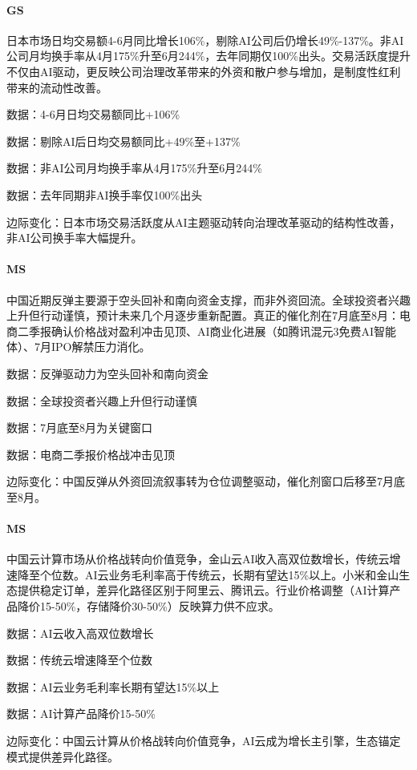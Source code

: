 \documentclass[11pt]{ctexart}
\begin{document}
\paragraph{GS} 日本市场日均交易额4-6月同比增长106\%，剔除AI公司后仍增长49\%-137\%。非AI公司月均换手率从4月175\%升至6月244\%，去年同期仅100\%出头。交易活跃度提升不仅由AI驱动，更反映公司治理改革带来的外资和散户参与增加，是制度性红利带来的流动性改善。
{\small\color{refgray}数据：4-6月日均交易额同比+106\%\par}
{\small\color{refgray}数据：剔除AI后日均交易额同比+49\%至+137\%\par}
{\small\color{refgray}数据：非AI公司月均换手率从4月175\%升至6月244\%\par}
{\small\color{refgray}数据：去年同期非AI换手率仅100\%出头\par}
{\small\color{refgray}边际变化：日本市场交易活跃度从AI主题驱动转向治理改革驱动的结构性改善，非AI公司换手率大幅提升。\par}
\paragraph{MS} 中国近期反弹主要源于空头回补和南向资金支撑，而非外资回流。全球投资者兴趣上升但行动谨慎，预计未来几个月逐步重新配置。真正的催化剂在7月底至8月：电商二季报确认价格战对盈利冲击见顶、AI商业化进展（如腾讯混元3免费AI智能体）、7月IPO解禁压力消化。
{\small\color{refgray}数据：反弹驱动力为空头回补和南向资金\par}
{\small\color{refgray}数据：全球投资者兴趣上升但行动谨慎\par}
{\small\color{refgray}数据：7月底至8月为关键窗口\par}
{\small\color{refgray}数据：电商二季报价格战冲击见顶\par}
{\small\color{refgray}边际变化：中国反弹从外资回流叙事转为仓位调整驱动，催化剂窗口后移至7月底至8月。\par}
\paragraph{MS} 中国云计算市场从价格战转向价值竞争，金山云AI收入高双位数增长，传统云增速降至个位数。AI云业务毛利率高于传统云，长期有望达15\%以上。小米和金山生态提供稳定订单，差异化路径区别于阿里云、腾讯云。行业价格调整（AI计算产品降价15-50\%，存储降价30-50\%）反映算力供不应求。
{\small\color{refgray}数据：AI云收入高双位数增长\par}
{\small\color{refgray}数据：传统云增速降至个位数\par}
{\small\color{refgray}数据：AI云业务毛利率长期有望达15\%以上\par}
{\small\color{refgray}数据：AI计算产品降价15-50\%\par}
{\small\color{refgray}边际变化：中国云计算从价格战转向价值竞争，AI云成为增长主引擎，生态锚定模式提供差异化路径。\par}
\end{document}
